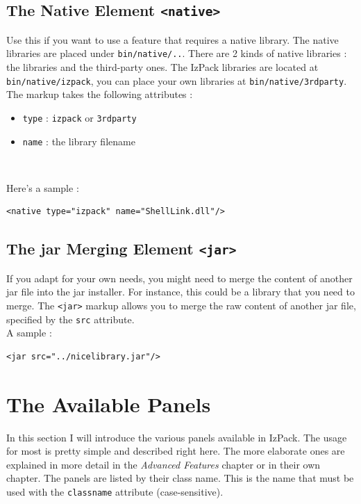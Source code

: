\subsection{The Native Element \texttt{<native>}}

Use this if you want to use a feature that requires a native library.
The native libraries are placed under \texttt{bin/native/..}. There are 2
kinds of native libraries : the \IzPack libraries and the third-party
ones. The IzPack libraries are located at \texttt{bin/native/izpack},
you can place your own libraries at \texttt{bin/native/3rdparty}. The
markup takes the following attributes :
\begin{itemize}

  \item \texttt{type} : \texttt{izpack} or \texttt{3rdparty}
  \item \texttt{name} : the library filename

\end{itemize}\

Here's a sample :
\footnotesize
\begin{verbatim}
<native type="izpack" name="ShellLink.dll"/>
\end{verbatim}
\normalsize

\subsection{The jar Merging Element \texttt{<jar>}}

If you adapt \IzPack for your own needs, you might need to merge the
content of another jar file into the jar installer. For instance, this
could be a library that you need to merge. The \texttt{<jar>} markup
allows you to merge the raw content of another jar file, specified by
the \texttt{src} attribute.\\

A sample :
\footnotesize
\begin{verbatim}
<jar src="../nicelibrary.jar"/>
\end{verbatim}
\normalsize

\section{The Available Panels}

In this section I will introduce the various panels available in IzPack.
The usage for most is pretty simple and described right here. The more
elaborate ones are explained in more detail in the \textit{Advanced
Features} chapter or in their own chapter. The panels are listed by
their class name. This is the name that must be used with the
\texttt{classname} attribute (case-sensitive).\\

